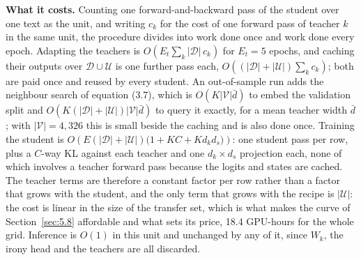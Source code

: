 \textbf{What it costs.} Counting one forward-and-backward pass of the student over one text as the
unit, and writing $c_k$ for the cost of one forward pass of teacher $k$ in the same unit, the
procedure divides into work done once and work done every epoch. Adapting the teachers is
$O\!\left(E_t \sum_k |\mathcal{D}|\, c_k\right)$ for $E_t = 5$ epochs, and caching their outputs over
$\mathcal{D} \cup \mathcal{U}$ is one further pass each, $O\!\left((|\mathcal{D}| + |\mathcal{U}|)
\sum_k c_k\right)$; both are paid once and reused by every student. An out-of-sample run adds the
neighbour search of equation (3.7), which is $O(K |\mathcal{V}| \bar d)$ to embed the validation split
and $O\!\left(K (|\mathcal{D}| + |\mathcal{U}|) |\mathcal{V}| \bar d\right)$ to query it exactly, for a
mean teacher width $\bar d$; with $|\mathcal{V}| = 4{,}326$ this is small beside the caching and is
also done once. Training the student is
$O\!\left(E (|\mathcal{D}| + |\mathcal{U}|)\big(1 + K C + K d_k d_s\big)\right)$: one student pass per
row, plus a $C$-way KL against each teacher and one $d_k \times d_s$ projection each, none of which
involves a teacher forward pass because the logits and states are cached. The teacher terms are
therefore a constant factor per row rather than a factor that grows with the student, and the only
term that grows with the recipe is $|\mathcal{U}|$: the cost is linear in the size of the transfer
set, which is what makes the curve of Section~\ref{sec:5.8} affordable and what sets its price, 18.4
GPU-hours for the whole grid. Inference is $O(1)$ in this unit and unchanged by any of it, since
$W_k$, the irony head and the teachers are all discarded.
